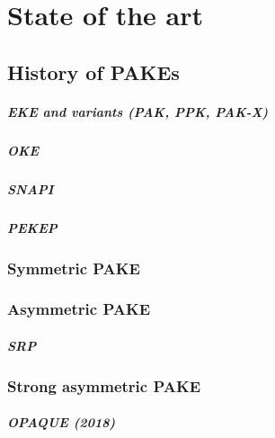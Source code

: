 \documentclass[../report.tex]{subfiles}
\begin{document}




\chapter{State of the art}

\section{History of PAKEs}
\paragraph{EKE and variants (PAK, PPK, PAK-X)}
\paragraph{OKE}
\paragraph{SNAPI}
\paragraph{PEKEP}
\subsection{Symmetric PAKE}
\subsection{Asymmetric PAKE}
\paragraph{SRP}
\subsection{Strong asymmetric PAKE}
\paragraph{OPAQUE (2018)}
\end{document}
